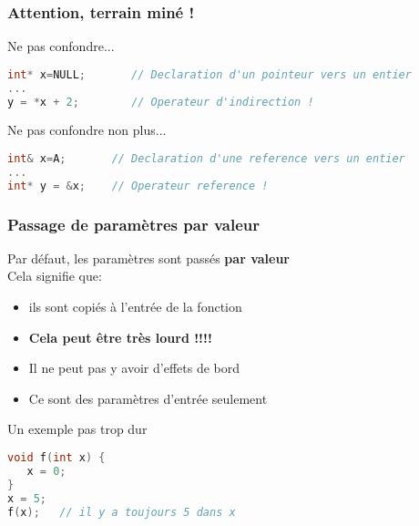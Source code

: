 \documentclass{beamer}
\begin{document}
\begin{frame}[fragile=singleslide,shrink=20]
\frametitle{Attention, terrain miné !}

\begin{block}{Ne pas confondre...}
\begin{lstlisting}[language=c++]
int* x=NULL;       // Declaration d'un pointeur vers un entier
...
y = *x + 2;        // Operateur d'indirection !

\end{lstlisting}
\end{block}

\begin{block}{Ne pas confondre non plus...}
\begin{lstlisting}[language=c++]
int& x=A;       // Declaration d'une reference vers un entier
...
int* y = &x;    // Operateur reference !

\end{lstlisting}
\end{block}
\end{frame}

\begin{frame}[fragile=singleslide,shrink=20]
\frametitle{Passage de paramètres par valeur}
Par défaut, les paramètres sont passés \textbf{par valeur} \\
Cela signifie que:
\begin{itemize}
\item{ils sont copiés à l'entrée de la fonction}
\item{\textbf{Cela peut être très lourd !!!!}}
\item{Il ne peut pas y avoir d'effets de bord}
\item{Ce sont des paramètres d'entrée seulement}
\end{itemize}

\begin{block}{Un exemple pas trop dur}
\begin{lstlisting}[language=c++]
void f(int x) {
   x = 0;
}
x = 5;
f(x);   // il y a toujours 5 dans x 
\end{lstlisting}
\end{block}
\end{frame}
\end{document}
